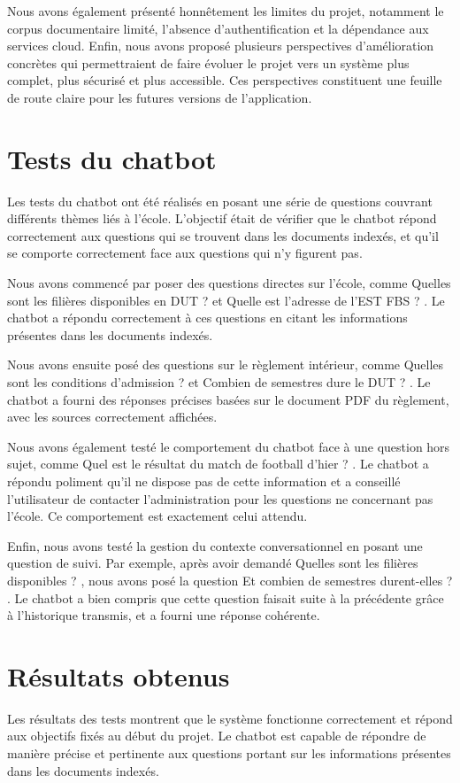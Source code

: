 \documentclass[12pt, a4paper, twoside]{report}
\begin{document}
Nous avons également présenté honnêtement les limites du projet, notamment le corpus documentaire limité, l'absence d'authentification et la dépendance aux services cloud. Enfin, nous avons proposé plusieurs perspectives d'amélioration concrètes qui permettraient de faire évoluer le projet vers un système plus complet, plus sécurisé et plus accessible. Ces perspectives constituent une feuille de route claire pour les futures versions de l'application.
\section{Tests du chatbot}
Les tests du chatbot ont été réalisés en posant une série de questions couvrant différents thèmes liés à l'école. L'objectif était de vérifier que le chatbot répond correctement aux questions qui se trouvent dans les documents indexés, et qu'il se comporte correctement face aux questions qui n'y figurent pas.

Nous avons commencé par poser des questions directes sur l'école, comme \og Quelles sont les filières disponibles en DUT ? \fg et \og Quelle est l'adresse de l'EST FBS ? \fg. Le chatbot a répondu correctement à ces questions en citant les informations présentes dans les documents indexés.

Nous avons ensuite posé des questions sur le règlement intérieur, comme \og Quelles sont les conditions d'admission ? \fg et \og Combien de semestres dure le DUT ? \fg. Le chatbot a fourni des réponses précises basées sur le document PDF du règlement, avec les sources correctement affichées.

Nous avons également testé le comportement du chatbot face à une question hors sujet, comme \og Quel est le résultat du match de football d'hier ? \fg. Le chatbot a répondu poliment qu'il ne dispose pas de cette information et a conseillé l'utilisateur de contacter l'administration pour les questions ne concernant pas l'école. Ce comportement est exactement celui attendu.

Enfin, nous avons testé la gestion du contexte conversationnel en posant une question de suivi. Par exemple, après avoir demandé \og Quelles sont les filières disponibles ? \fg, nous avons posé la question \og Et combien de semestres durent-elles ? \fg. Le chatbot a bien compris que cette question faisait suite à la précédente grâce à l'historique transmis, et a fourni une réponse cohérente.

\section{Résultats obtenus}
Les résultats des tests montrent que le système fonctionne correctement et répond aux objectifs fixés au début du projet. Le chatbot est capable de répondre de manière précise et pertinente aux questions portant sur les informations présentes dans les documents indexés.
\end{document}
